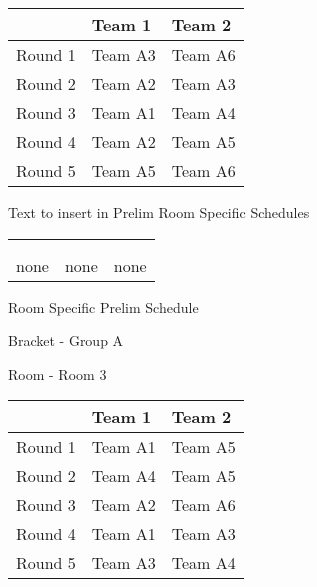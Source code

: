 \documentclass{article}%
\begin{document}
%
\begin{tabularx}{\textwidth}{|c|Y|Y|}%
\hline%
&Team 1&Team 2\\%
\hline%
Round 1&Team A3&Team A6\\%
Round 2&Team A2&Team A3\\%
Round 3&Team A1&Team A4\\%
Round 4&Team A2&Team A5\\%
Round 5&Team A5&Team A6\\%
\hline%
\end{tabularx}%
\vspace*{8pt}%
Text to insert in Prelim Room Specific Schedules%
\vspace*{30pt}%
\newline%
%
\begin{tabularx}{\textwidth}{YYY}%
  &  &  \\%
\\%
none&none&none\\%
\end{tabularx}%
\newpage%
\begin{center}%
\begin{Huge}%
Room Specific Prelim Schedule%
\end{Huge}%
\vspace*{8pt}%
\linebreak%
\begin{Large}%
Bracket {-} Group A%
\end{Large}%
\vspace*{8pt}%
\linebreak%
\vspace*{8pt}%
\begin{Large}%
Room {-} Room 3%
\end{Large}%
\end{center}%
%
\begin{tabularx}{\textwidth}{|c|Y|Y|}%
\hline%
&Team 1&Team 2\\%
\hline%
Round 1&Team A1&Team A5\\%
Round 2&Team A4&Team A5\\%
Round 3&Team A2&Team A6\\%
Round 4&Team A1&Team A3\\%
Round 5&Team A3&Team A4\\%
\hline%
\end{tabularx}%
\vspace*{8pt}%
\end{document}
